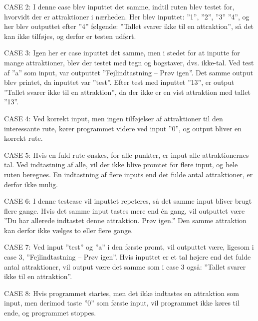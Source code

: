 CASE 2: I denne case blev inputtet det samme, indtil ruten blev testet for, hvorvidt der er attraktioner i nærheden. Her blev inputtet: ”1”, ”2”, ”3” ”4”, og her blev outputtet efter ”4” følgende: ”Tallet svarer ikke til en attraktion”, så det kan ikke tilføjes, og derfor er testen udført.

CASE 3: Igen her er case inputtet det samme, men i stedet for at inputte for mange attraktioner, blev der testet med tegn og bogstaver, dvs. ikke-tal. Ved test af ”a” som input, var outputtet ”Fejlindtastning – Prøv igen”. Det samme output blev printet, da inputtet var ”test”. Efter test med inputtet ”13”, er output ”Tallet svarer ikke til en attraktion”, da der ikke er en vist attraktion med tallet ”13”.

CASE 4: Ved korrekt input, men ingen tilføjelser af attraktioner til den interessante rute, kører programmet videre ved input ”0”, og output bliver en korrekt rute.

CASE 5: Hvis en fuld rute ønskes, for alle punkter, er input alle attraktionernes tal. Ved indtastning af alle, vil der ikke blive promtet for flere input, og hele ruten beregnes. En indtastning af flere inputs end det fulde antal attraktioner, er derfor ikke mulig.

CASE 6: I denne testcase vil inputtet repeteres, så det samme input bliver brugt flere gange. Hvis det samme input tastes mere end én gang, vil outputtet være ”Du har allerede indtastet denne attraktion. Prøv igen.” Den samme attraktion kan derfor ikke vælges to eller flere gange.

CASE 7: Ved input ”test” og ”a” i den første promt, vil outputtet være, ligesom i case 3, ”Fejlindtastning – Prøv igen”. Hvis inputtet er et tal højere end det fulde antal attraktioner, vil output være det samme som i case 3 også: ”Tallet svarer ikke til en attraktion”.

CASE 8: Hvis programmet startes, men det ikke indtastes en attraktion som input, men derimod taste ”0” som første input, vil programmet ikke køres til ende, og programmet stoppes.
